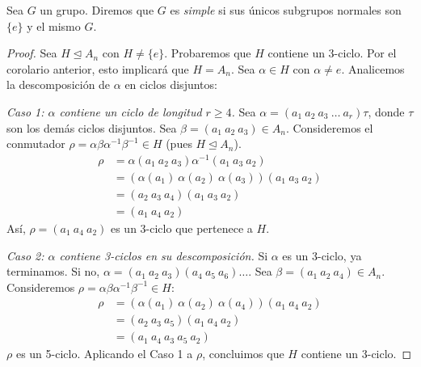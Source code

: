 \begin{defi}
    Sea $G$ un grupo. Diremos que $G$ es \textit{simple} si sus únicos subgrupos normales son $\{e\}$ y el mismo $G$.
\end{defi}


\begin{proof}
    Sea $H \trianglelefteq A_n$ con $H \neq \{e\}$. Probaremos que $H$ contiene un 3-ciclo. Por el corolario anterior, esto implicará que $H = A_n$.
    Sea $\alpha \in H$ con $\alpha \neq e$. Analicemos la descomposición de $\alpha$ en ciclos disjuntos:

    \textit{Caso 1: $\alpha$ contiene un ciclo de longitud $r \ge 4$.}
    Sea $\alpha = (a_1 \ a_2 \ a_3 \ \dots \ a_r) \tau$, donde $\tau$ son los demás ciclos disjuntos.
    Sea $\beta = (a_1 \ a_2 \ a_3) \in A_n$.
    Consideremos el conmutador $\rho = \alpha \beta \alpha^{-1} \beta^{-1} \in H$ (pues $H \trianglelefteq A_n$).
    \begin{equation*}
    \begin{aligned}
        \rho &= \alpha (a_1 \ a_2 \ a_3) \alpha^{-1} (a_1 \ a_3 \ a_2) \\
             &= (\alpha(a_1) \ \alpha(a_2) \ \alpha(a_3)) (a_1 \ a_3 \ a_2) \\
             &= (a_2 \ a_3 \ a_4) (a_1 \ a_3 \ a_2) \\
             &= (a_1 \ a_4 \ a_2)
    \end{aligned}
    \end{equation*}
    Así, $\rho = (a_1 \ a_4 \ a_2)$ es un 3-ciclo que pertenece a $H$.

    \textit{Caso 2: $\alpha$ contiene 3-ciclos en su descomposición.}
    Si $\alpha$ es un 3-ciclo, ya terminamos.
    Si no, $\alpha = (a_1 \ a_2 \ a_3)(a_4 \ a_5 \ a_6) \dots$.
    Sea $\beta = (a_1 \ a_2 \ a_4) \in A_n$.
    Consideremos $\rho = \alpha \beta \alpha^{-1} \beta^{-1} \in H$:
    \begin{equation*}
    \begin{aligned}
        \rho &= (\alpha(a_1) \ \alpha(a_2) \ \alpha(a_4)) (a_1 \ a_4 \ a_2) \\
             &= (a_2 \ a_3 \ a_5) (a_1 \ a_4 \ a_2) \\
             &= (a_1 \ a_4 \ a_3 \ a_5 \ a_2)
    \end{aligned}
    \end{equation*}
    $\rho$ es un 5-ciclo. Aplicando el Caso 1 a $\rho$, concluimos que $H$ contiene un 3-ciclo.


\end{proof}
